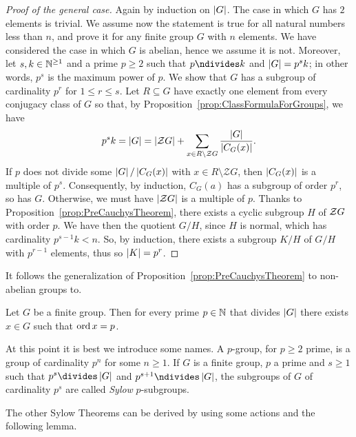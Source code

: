 \begin{proof}[Proof of the general case]
Again by induction on \(\left\lvert G\right\rvert\). The case in which \(G\) has \(2\) elements is trivial. We assume now the statement is true for all natural numbers less than \(n\), and prove it for any finite group \(G\) with \(n\) elements. We have considered the case in which \(G\) is abelian, hence we assume it is not. Moreover, let \(s, k \in \mathbb N^{\ge 1}\) and a prime \(p \ge 2\) such that \(p \ndivides k\) and \(\left\lvert G\right\rvert = p^s k\); in other words, \(p^s\) is the maximum power of \(p\). We show that \(G\) has a subgroup of cardinality \(p^r\) for \(1 \le r \le s\). Let \(R \subseteq G\) have exactly one element from every conjugacy class of \(G\) so that, by Proposition~\ref{prop:ClassFormulaForGroups}, we have
\[p^s k = \left\lvert G\right\rvert = \left\lvert\mathcal Z G\right\rvert + \sum_{x \in R \setminus \mathcal Z G} \frac{\left\lvert G\right\rvert}{\left\lvert C_G(x)\right\rvert} .\]
If \(p\) does not divide some \(\left\lvert G\right\rvert/\left\lvert C_G(x)\right\rvert\) with \(x \in R \setminus \mathcal Z G\), then \(\left\lvert C_G(x)\right\rvert\) is a multiple of \(p^s\). Consequently, by induction, \(C_G(a)\) has a subgroup of order \(p^r\), so has \(G\). Otherwise, we must have \(\left\lvert\mathcal Z G\right\rvert\) is a multiple of \(p\). Thanks to Proposition~\ref{prop:PreCauchysTheorem}, there exists a cyclic subgroup \(H\) of \(\mathcal Z G\) with order \(p\). We have then the quotient \(G/H\), since \(H\) is normal, which has cardinality \(p^{s-1}k < n\). So, by induction, there exists a subgroup \(K/H\) of \(G/H\) with \(p^{r-1}\) elements, thus so \(\left\lvert K\right\rvert = p^r\).
\end{proof}

It follows the generalization of Proposition~\ref{prop:PreCauchysTheorem} to non-abelian groups to.

\begin{corollary}\label{coroll:CauchysTheorem}
Let \(G\) be a finite group. Then for every prime \(p \in \mathbb N\) that divides \(\left\lvert G\right\rvert\) there exists \(x \in G\) such that \(\operatorname{ord} x = p\).
\end{corollary}

At this point it is best we introduce some names. A \(p\)-group, for \(p \ge 2\) prime, is a group of cardinality \(p^n\) for some \(n \ge 1\). If \(G\) is a finite group, \(p\) a prime and \(s \ge 1\) such that \(p^s \divides \abs G\) and \(p^{s+1} \ndivides \abs G\), the subgroups of \(G\) of cardinality \(p^s\) are called {\em Sylow} \(p\)-subgroups.

The other Sylow Theorems can be derived by using some actions and the following lemma.

